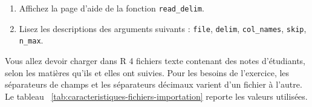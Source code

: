 \documentclass[
  11pt,
]{book}
\providecommand{\tightlist}{%
  \setlength{\itemsep}{0pt}\setlength{\parskip}{0pt}}
\numberwithin{equation}{section}
\numberwithin{countremarque}{section}
\newenvironment{greenbox}{
  \begin{tcolorbox}[breakable, colback=vert,coltext=black,
                  colframe=grisfonce]}
 {\end{tcolorbox}}
\begin{document}
\begin{greenbox}

\begin{enumerate}
\def\labelenumi{\arabic{enumi}.}
\tightlist
\item
  Affichez la page d'aide de la fonction \texttt{read\_delim}.
\item
  Lisez les descriptions des arguments suivants : \texttt{file}, \texttt{delim}, \texttt{col\_names}, \texttt{skip}, \texttt{n\_max}.
\end{enumerate}

\end{greenbox}

Vous allez devoir charger dans R 4 fichiers texte contenant des notes d'étudiants, selon les matières qu'ils et elles ont suivies. Pour les besoins de l'exercice, les séparateurs de champs et les séparateurs décimaux varient d'un fichier à l'autre. Le tableau ~\ref{tab:caracteristiques-fichiers-importation} reporte les valeurs utilisées.
\end{document}

